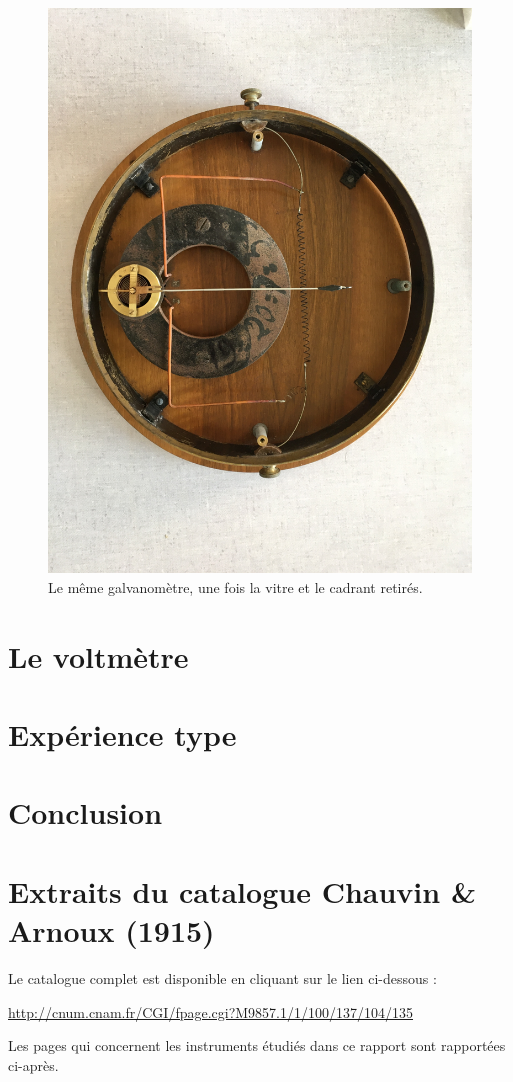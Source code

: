 \documentclass[12pt,a4paper,fleqn]{article}
\begin{document}
\begin{figure}[htbp]
    \center
    \includegraphics[height=300 pt, trim=500 100 600 200, clip]{images/IMG_4037.JPG}
    \caption{Le même galvanomètre, une fois la vitre et le cadrant retirés.}
    \label{fig:galva_amp_int}
\end{figure}



\section{Le voltmètre}



\section{Expérience type}



\section*{Conclusion}

\newpage
\appendix



\newpage
\appendix


\section{Extraits du catalogue Chauvin \& Arnoux (1915)}
\label{ann:catalogue}

Le catalogue complet est disponible en cliquant sur le lien ci-dessous :

\noindent
\href{http://cnum.cnam.fr/CGI/fpage.cgi?M9857.1/1/100/137/104/135}{http://cnum.cnam.fr/CGI/fpage.cgi?M9857.1/1/100/137/104/135}

Les pages qui concernent les instruments étudiés dans ce rapport sont rapportées ci-après.


\end{document}
